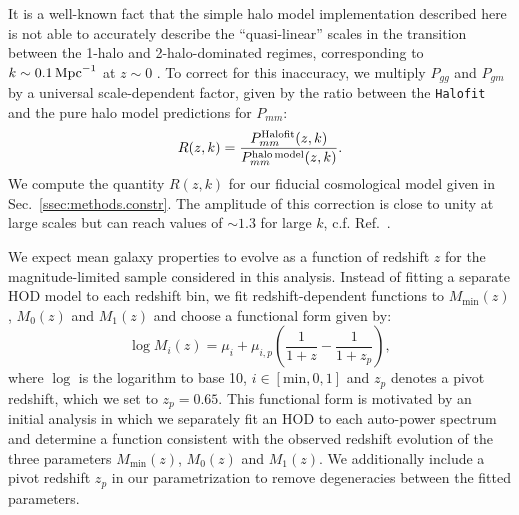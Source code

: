 \documentclass[a4paper,11pt]{article}
\begin{document}
    It is a well-known fact that the simple halo model implementation described here is not able to accurately describe the ``quasi-linear'' scales in the transition between the 1-halo and 2-halo-dominated regimes, corresponding to $k\sim0.1\,{\rm Mpc}^{-1}$ at $z\sim0$ \citep{2015MNRAS.454.1958M}. To correct for this inaccuracy, we multiply $P_{gg}$ and $P_{gm}$ by a universal scale-dependent factor, given by the ratio between the {\tt Halofit} and the pure halo model predictions for $P_{mm}$:
    \begin{equation}
      R(z,k)=\frac{P^{\rm Halofit}_{mm}(z,k)}{P^{\rm halo\,model}_{mm}(z,k)}.
    \end{equation}
We compute the quantity $R(z,k)$ for our fiducial cosmological model given in Sec.~\ref{ssec:methods.constr}. The amplitude of this correction is close to unity at large scales but can reach values of $\sim 1.3$ for large $k$, c.f. Ref.~\cite{2015MNRAS.454.1958M}.
 
    We expect mean galaxy properties to evolve as a function of redshift $z$ for the magnitude-limited sample considered in this analysis. Instead of fitting a separate HOD model to each redshift bin, we fit redshift-dependent functions to $M_{\mathrm{min}}(z)$, $M_{0}(z)$ and $M_{1}(z)$ and choose a functional form given by:
    \begin{equation}
      \log{M_{i}(z)} = \mu_{i} + \mu_{i, p} \left(\frac{1}{1+z} - \frac{1}{1+z_{p}}\right),
    \end{equation}
    where $\log$ is the logarithm to base 10, $i \in [\mathrm{min}, 0, 1]$ and $z_{p}$ denotes a pivot redshift, which we set to $z_{p} = 0.65$. This functional form is motivated by an initial analysis in which we separately fit an HOD to each auto-power spectrum and determine a function consistent with the observed redshift evolution of the three parameters $M_{\mathrm{min}}(z)$, $M_{0}(z)$ and $M_{1}(z)$. We additionally include a pivot redshift $z_{p}$ in our parametrization to remove degeneracies between the fitted parameters.
\end{document}
